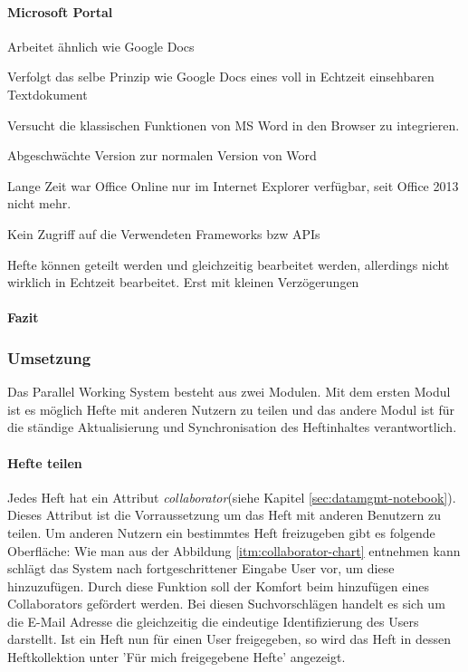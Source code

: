 \paragraph{Microsoft Portal}
Arbeitet ähnlich wie Google Docs

Verfolgt das selbe Prinzip wie Google Docs eines voll in Echtzeit einsehbaren Textdokument

Versucht die klassischen Funktionen von MS Word in den Browser zu integrieren.

Abgeschwächte Version zur normalen Version von Word 

Lange Zeit war Office Online nur im Internet Explorer verfügbar, seit Office 2013 nicht mehr.

Kein Zugriff auf die Verwendeten Frameworks bzw APIs

Hefte können geteilt werden und gleichzeitig bearbeitet werden, allerdings nicht wirklich in Echtzeit bearbeitet. Erst mit kleinen Verzögerungen
\paragraph{Fazit}

\newpage
\subsubsection{Umsetzung}
Das Parallel Working System besteht aus zwei Modulen. Mit dem ersten Modul ist es möglich Hefte mit anderen Nutzern zu teilen und das andere Modul ist für die ständige Aktualisierung und Synchronisation des Heftinhaltes verantwortlich. 
\paragraph{Hefte teilen}
Jedes Heft hat ein Attribut \textit{collaborator}(siehe Kapitel \ref{sec:datamgmt-notebook}). Dieses Attribut ist die Vorraussetzung um das Heft mit anderen Benutzern zu teilen. 
Um anderen Nutzern ein bestimmtes Heft freizugeben gibt es folgende Oberfläche:
Wie man aus der Abbildung \ref{itm:collaborator-chart} entnehmen kann schlägt das System nach fortgeschrittener Eingabe User vor, um diese hinzuzufügen. Durch diese Funktion soll der Komfort beim hinzufügen eines Collaborators gefördert werden. Bei diesen Suchvorschlägen handelt es sich um die E-Mail Adresse die gleichzeitig die eindeutige Identifizierung des Users darstellt.
Ist ein Heft nun für einen User freigegeben, so wird das Heft in dessen Heftkollektion unter 'Für mich freigegebene Hefte' angezeigt. \\

